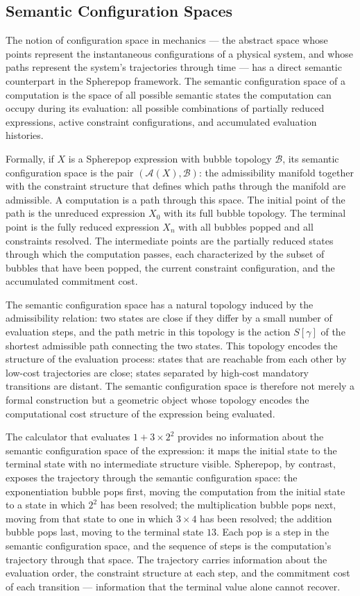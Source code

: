 \documentclass[12pt,openany]{book}
\theoremstyle{plain}
\theoremstyle{definition}
\theoremstyle{remark}
\begin{document}
\subsection{Semantic Configuration Spaces}

The notion of configuration space in mechanics — the abstract space whose points represent the instantaneous configurations of a physical system, and whose paths represent the system's trajectories through time — has a direct semantic counterpart in the Spherepop framework. The semantic configuration space of a computation is the space of all possible semantic states the computation can occupy during its evaluation: all possible combinations of partially reduced expressions, active constraint configurations, and accumulated evaluation histories.

Formally, if $X$ is a Spherepop expression with bubble topology $\mathcal{B}$, its semantic configuration space is the pair $(\mathcal{A}(X), \mathcal{B})$: the admissibility manifold together with the constraint structure that defines which paths through the manifold are admissible. A computation is a path through this space. The initial point of the path is the unreduced expression $X_0$ with its full bubble topology. The terminal point is the fully reduced expression $X_n$ with all bubbles popped and all constraints resolved. The intermediate points are the partially reduced states through which the computation passes, each characterized by the subset of bubbles that have been popped, the current constraint configuration, and the accumulated commitment cost.

The semantic configuration space has a natural topology induced by the admissibility relation: two states are close if they differ by a small number of evaluation steps, and the path metric in this topology is the action $S[\gamma]$ of the shortest admissible path connecting the two states. This topology encodes the structure of the evaluation process: states that are reachable from each other by low-cost trajectories are close; states separated by high-cost mandatory transitions are distant. The semantic configuration space is therefore not merely a formal construction but a geometric object whose topology encodes the computational cost structure of the expression being evaluated.

The calculator that evaluates $1 + 3 \times 2^2$ provides no information about the semantic configuration space of the expression: it maps the initial state to the terminal state with no intermediate structure visible. Spherepop, by contrast, exposes the trajectory through the semantic configuration space: the exponentiation bubble pops first, moving the computation from the initial state to a state in which $2^2$ has been resolved; the multiplication bubble pops next, moving from that state to one in which $3 \times 4$ has been resolved; the addition bubble pops last, moving to the terminal state $13$. Each pop is a step in the semantic configuration space, and the sequence of steps is the computation's trajectory through that space. The trajectory carries information about the evaluation order, the constraint structure at each step, and the commitment cost of each transition — information that the terminal value alone cannot recover.
\end{document}
